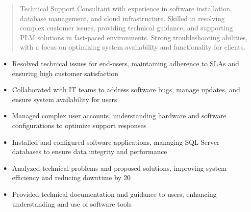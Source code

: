 



\makecvheader

\begin{quote}
  \noindent
  Technical Support Consultant with experience in software installation, database management, and cloud infrastructure. Skilled in resolving complex customer issues, providing technical guidance, and supporting PLM solutions in fast-paced environments. Strong troubleshooting abilities, with a focus on optimizing system availability and functionality for clients.
\end{quote}

\par\smallskip
\noindent
\begin{minipage}{20cm}
  \begin{minipage}{9.75cm}
    \begin{itemize}
      \item Resolved technical issues for end-users, maintaining adherence to SLAs and ensuring high customer satisfaction
      \item Collaborated with IT teams to address software bugs, manage updates, and ensure system availability for users
      \item Managed complex user accounts, understanding hardware and software configurations to optimize support responses
    \end{itemize}
  \end{minipage}
  \hfill
  \begin{minipage}{9.75cm}
    \begin{itemize}
      \item Installed and configured software applications, managing SQL Server databases to ensure data integrity and performance
      \item Analyzed technical problems and proposed solutions, improving system efficiency and reducing downtime by 20%
      \item Provided technical documentation and guidance to users, enhancing understanding and use of software tools
    \end{itemize}
  \end{minipage}
\end{minipage}
\par\smallskip
\divider


